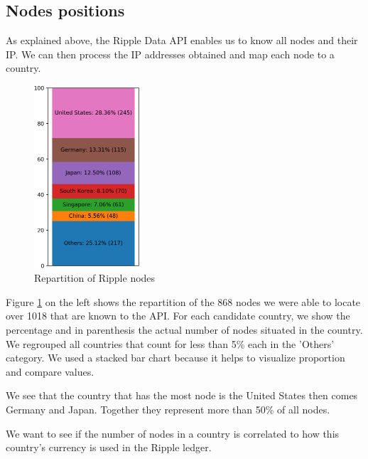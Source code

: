 \subsection{Nodes positions}
As explained above, the Ripple Data API\cite{data-api} enables us to know all nodes and their IP. We can then process the IP addresses obtained and map each node to a country.

\begin{figure}
    \includegraphics[width = 0.35\textwidth,keepaspectratio]{repartiton_of_nodes.png}
    \caption{Repartition of Ripple nodes}
    \label{fig:repartition}
\end{figure}

Figure \ref{fig:repartition} on the left shows the repartition of the 868 nodes we were able to locate over 1018 that are known to the API. For each candidate country, we show the percentage and in parenthesis the actual number of nodes situated in the country. We regrouped all countries that count for less than 5\% each in the 'Others' category. We used a stacked bar chart because it helps to visualize proportion and compare values.

We see that the country that has the most node is the United States then comes Germany and Japan. Together they represent more than 50\% of all nodes. 
\vspace{\baselineskip}

We want to see if the number of nodes in a country is correlated to how this country's currency is used in the Ripple ledger.

